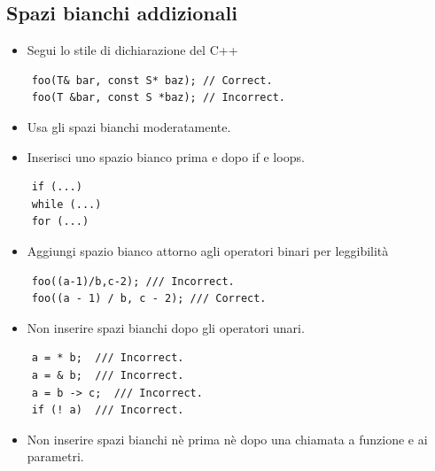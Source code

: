 \subsection{Spazi bianchi addizionali}

\begin{itemize}
	\item \textsf{\small Segui lo stile di dichiarazione del C++}
\end{itemize}

\begin{lstlisting}
	foo(T& bar, const S* baz); // Correct.
	foo(T &bar, const S *baz); // Incorrect.
\end{lstlisting}

\begin{itemize}
	\item \textsf{\small Usa gli spazi bianchi moderatamente.}
	\item \textsf{\small Inserisci uno spazio bianco prima e dopo if e loops.}
\end{itemize}

\begin{lstlisting}
	if (...)
	while (...)
	for (...)
\end{lstlisting}

\begin{itemize}
	\item \textsf{\small Aggiungi spazio bianco attorno agli operatori binari per leggibilità}
\end{itemize}

\begin{lstlisting}
	foo((a-1)/b,c-2); /// Incorrect.
	foo((a - 1) / b, c - 2); /// Correct.
\end{lstlisting}

\begin{itemize}
	\item \textsf{\small Non inserire spazi bianchi dopo gli operatori unari.}
\end{itemize}

\begin{lstlisting}
	a = * b;  /// Incorrect.
	a = & b;  /// Incorrect.
	a = b -> c;  /// Incorrect.
	if (! a)  /// Incorrect.
\end{lstlisting}

\begin{itemize}
	\item \textsf{\small Non inserire spazi bianchi nè prima nè dopo una chiamata a funzione e ai parametri.}
\end{itemize}

